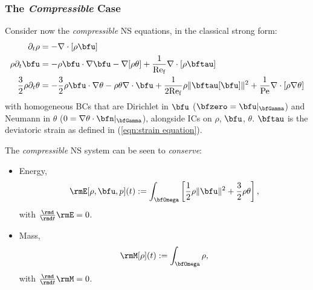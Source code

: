 \subsubsection*{The \emph{Compressible} Case}
    Consider now the \emph{compressible} NS equations, in the classical strong form:
    \begin{align}
                           \partial_{t}\rho  &=  - \nabla\cdot[\rho\bfu]  \label{eqn:compressible NS mass equation}  \\
                       \rho\partial_{t}\bfu  &=  - \rho\bfu\cdot\nabla\bfu - \nabla[\rho\theta] + \frac{1}{\rmRef}\nabla\cdot[\rho\bftau]  \label{eqn:compressible NS momentum equation}  \\
        \frac{3}{2}\rho\partial_{t}\theta  &=  - \frac{3}{2}\rho\bfu\cdot\nabla\theta - \rho\theta\nabla\cdot\bfu + \frac{1}{2\rmRef}\rho\|\bftau[\bfu]\|^{2} + \frac{1}{\rmPe}\nabla\cdot[\rho\nabla\theta]  \label{eqn:compressible NS energy equation}
    \end{align}
    with homogeneous BCs that are Dirichlet in $\bfu$ ($\bfzero  =  \bfu|_{\bfGamma}$) and Neumann in $\theta$ ($0  =  \nabla\theta\cdot\bfn|_{\bfGamma}$), alongside ICs on $\rho$, $\bfu$, $\theta$. $\bftau$ is the deviatoric strain as defined in (\ref{eqn:strain equation}).

    \shortline

    The \emph{compressible} NS system can be seen to \emph{conserve}:
    \begin{itemize}
        \item  Energy,
        \begin{equation}\label{eqn:compressible NS energy definition}
            \rmE[\rho, \bfu, p](t)  :=  \int_{\bfOmega}\left[\frac{1}{2}\rho\|\bfu\|^{2} + \frac{3}{2}\rho\theta\right],
        \end{equation}
        with $\frac{\rmd}{\rmd t}\rmE  =  0$.
        \item  Mass,
        \begin{equation}\label{eqn:compressible NS mass definition}
            \rmM[\rho](t)  :=  \int_{\bfOmega}\rho,
        \end{equation}
        with $\frac{\rmd}{\rmd t}\rmM  =  0$.
    \end{itemize}

    \shortline

